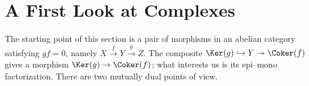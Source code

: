 
\section{A First Look at Complexes}\label{sec:cohomology}
\hypertarget{o014.aljabr2.chapter2.first-look-at-complexes}{ }

The starting point of this section is a pair of morphisms in an abelian
category satisfying $gf=0$, namely
$X \xrightarrow{f} Y \xrightarrow{g} Z$. The composite
$\Ker(g) \hookrightarrow Y \twoheadrightarrow \Coker(f)$ gives a morphism
$\Ker(g) \to \Coker(f)$; what interests us is its epi--mono factorization.
There are two mutually dual points of view.

